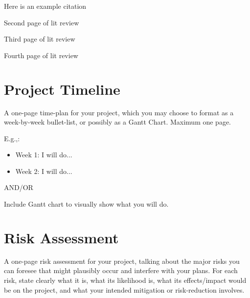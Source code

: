 \documentclass{article}
\begin{document}
Here is an example citation \cite{turing:1950}
\newpage

Second page of lit review

\newpage

Third page of lit review

\newpage

Fourth page of lit review

\newpage


\newpage

\appendix
\section{Project Timeline}

A one-page time-plan for your project, which you may choose to format as a week-by-week bullet-list, or possibly as a Gantt Chart. Maximum one page.

E.g.,:
\begin{itemize}
    \item Week 1: I will do...
    \item Week 2: I will do...
\end{itemize}

AND/OR

Include Gantt chart to visually show what you will do.


\newpage

\section{Risk Assessment}

A one-page risk assessment for your project, talking about the major risks you can foresee that might plausibly occur and interfere with your plans. For each risk, state clearly what it is, what its likelihood is, what its effects/impact would be on the project, and what your intended mitigation or risk-reduction involves. 
\end{document}
